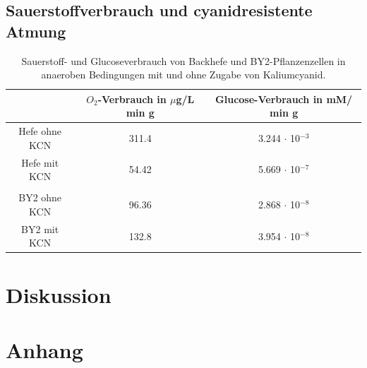 \documentclass[10pt,a4paper]{article}
\begin{document}
	\subsection{Sauerstoffverbrauch und cyanidresistente Atmung}
		\begin{table}[H]
		\centering
		\caption{Sauerstoff- und Glucoseverbrauch von Backhefe und BY2-Pflanzenzellen in anaeroben Bedingungen mit und ohne Zugabe von Kaliumcyanid.}
		\label{tab:O2verbrauch und CN}
		\begin{tabular}{ccc}
			\toprule
			& $O_2$-Verbrauch in $\mu$g/L min g& Glucose-Verbrauch in mM/ min g\\
			\midrule
			Hefe ohne KCN & 311.4 & 3.244 $\cdot$ 10$^{-3}$\\
			Hefe mit KCN & 54.42& 5.669 $\cdot$ 10$^{-7}$\\
			& & \\
			BY2 ohne KCN & 96.36 & 2.868 $\cdot$ 10$^{-8}$\\
			BY2 mit KCN & 132.8& 3.954 $\cdot$ 10$^{-8}$\\
			\bottomrule
		\end{tabular}
	\end{table}	
	
	\section{Diskussion}

	\section{Anhang}
\end{document}
